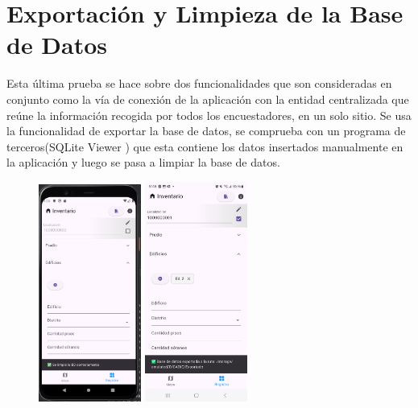 \section{Exportación y Limpieza de la Base de Datos}
Esta última prueba se hace sobre dos funcionalidades que son consideradas en conjunto como la vía de conexión de la aplicación con la entidad centralizada que reúne la información recogida
por todos los encuestadores, en un solo sitio. Se usa la funcionalidad de exportar la base de datos, se comprueba con un programa de terceros(SQLite Viewer \cite{sqliteViewer}) que esta contiene los datos insertados manualmente
en la aplicación y luego se pasa a limpiar la base de datos.
\begin{figure}[h]
    \centering
    \includegraphics[width=0.3\textwidth]{Graphics/Capitulo 4/Pixel 4 [emulador]/4.7/1.png}
    \includegraphics[width=0.3\textwidth]{Graphics/Capitulo 4/Galaxy S23 Ultra Android/4.7/1.jpg}

\end{figure}
